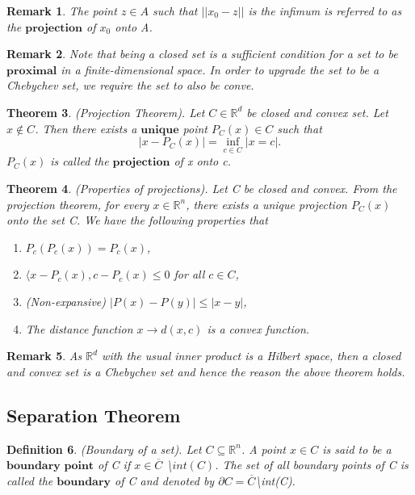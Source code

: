 \documentclass[twoside]{article}
\newcounter{lecnum}
\newtheorem{theorem}{Theorem}[lecnum]
\newtheorem{remark}[theorem]{Remark}
\newtheorem{definition}[theorem]{Definition}
\begin{document}
\begin{remark}The point $z \in A$ such that $||x_0 - z||$ is the infimum is referred to as the $\textbf{projection}$ of $x_0$ onto A. 
\end{remark}

\begin{remark}Note that being a closed set is a sufficient condition for a set to be $\textbf{proximal}$ in a finite-dimensional space. In order to upgrade the set to be a Chebychev set, we require the set to also be conve.
\end{remark}

\begin{theorem}(Projection Theorem). Let $C \in \mathbb{R}^d$ be closed and convex set. Let $x \not\in C$. Then there exists a $\textbf{unique}$ point $P_C(x) \in C$ such that
$$
|x - P_C(x)| = \inf_{c \in C}|x = c|.
$$
$P_C(x)$ is called the $\textbf{projection}$ of x onto c.\\
\end{theorem}


\begin{theorem}(Properties of projections). Let C be closed and convex. From the projection theorem, for every $x \in \mathbb{R}^n$, there exists a unique projection $P_C(x)$ onto the set C. We have the following properties that 
\begin{enumerate}
\item $P_c(P_c(x)) = P_c(x)$,
\item $\langle x - P_c(x), c - P_c(x) \leq 0$ for all $c \in C$,
\item (Non-expansive) $|P(x) - P(y)| \leq |x - y|$,
\item The distance function $x \rightarrow d(x,c)$ is a convex function.
\end{enumerate}
\end{theorem}

\begin{remark}As $\mathbb{R}^d$ with the usual inner product is a Hilbert space, then a closed and convex set is a Chebychev set and hence the reason the above theorem holds.
\end{remark}

\subsection{Separation Theorem}

\begin{definition}(Boundary of a set). Let $C \subseteq \mathbb{R}^n$. A point $x \in C$ is said to be a $\textbf{boundary point}$ of C if $x \in \overline{C}$ \textbackslash $int(C)$. The set of all boundary points of C is called the $\textbf{boundary}$ of C and denoted by $\partial C = \overline{C}$\textbackslash int(C).
\end{definition}
\end{document}
